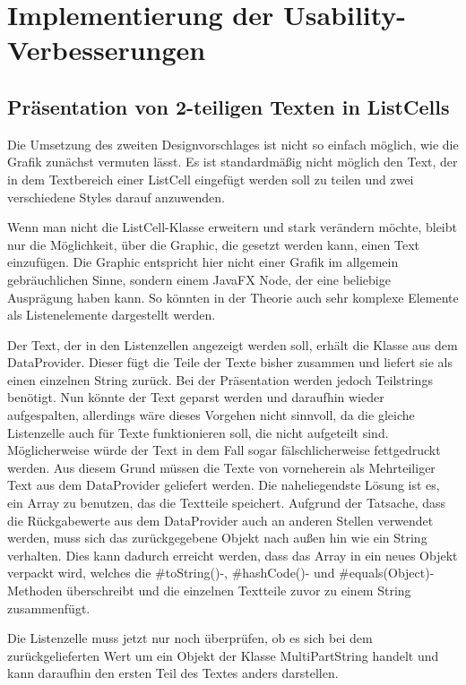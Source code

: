 \chapter{Implementierung der Usability-Verbesserungen}
\section{Präsentation von 2-teiligen Texten in ListCells} \label{sec:verbListCell}
Die Umsetzung des zweiten Designvorschlages ist nicht so einfach möglich, wie die Grafik zunächst vermuten lässt. Es ist standardmäßig nicht möglich den Text, der in dem Textbereich einer ListCell eingefügt werden soll zu teilen und zwei verschiedene Styles darauf anzuwenden.

Wenn man nicht die ListCell-Klasse erweitern und stark verändern möchte, bleibt nur die Möglichkeit, über die Graphic, die gesetzt werden kann, einen Text einzufügen. Die Graphic entspricht hier nicht einer Grafik im allgemein gebräuchlichen Sinne, sondern einem JavaFX Node, der eine beliebige Ausprägung haben kann. So könnten in der Theorie auch sehr komplexe Elemente als Listenelemente dargestellt werden.

Der Text, der in den Listenzellen angezeigt werden soll, erhält die Klasse aus dem DataProvider. Dieser fügt die Teile der Texte bisher zusammen und liefert sie als einen einzelnen String zurück. Bei der Präsentation werden jedoch Teilstrings benötigt. Nun könnte der Text geparst werden und daraufhin wieder aufgespalten, allerdings wäre dieses Vorgehen nicht sinnvoll, da die gleiche Listenzelle auch für Texte funktionieren soll, die nicht aufgeteilt sind. Möglicherweise würde der Text in dem Fall sogar fälschlicherweise fettgedruckt werden. Aus diesem Grund müssen die Texte von vorneherein als Mehrteiliger Text aus dem DataProvider geliefert werden. Die naheliegendste Lösung ist es, ein Array zu benutzen, das die Textteile speichert. Aufgrund der Tatsache, dass die Rückgabewerte aus dem DataProvider auch an anderen Stellen verwendet werden, muss sich das zurückgegebene Objekt nach außen hin wie ein String verhalten. Dies kann dadurch erreicht werden, dass das Array in ein neues Objekt verpackt wird, welches die \#toString()-, \#hashCode()- und \#equals(Object)- Methoden überschreibt und die einzelnen Textteile zuvor zu einem String zusammenfügt.

Die Listenzelle muss jetzt nur noch überprüfen, ob es sich bei dem zurückgelieferten Wert um ein Objekt der Klasse MultiPartString handelt und kann daraufhin den ersten Teil des Textes anders darstellen.

